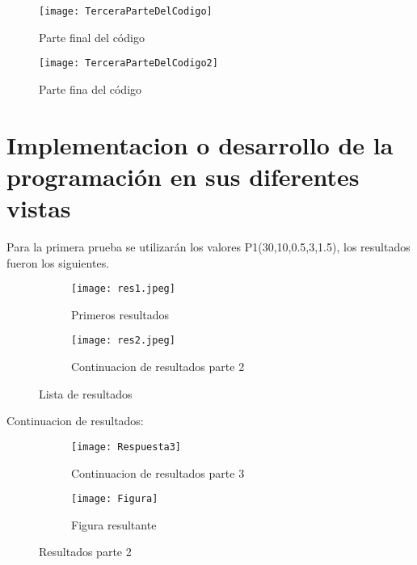 \documentclass{article}
\begin{document}
\begin{figure}[H] %
    \centering
    \texttt{[image: TerceraParteDelCodigo]} %
    \caption{Parte final del código}   
   \label{!}
\end{figure}
\begin{figure}[H] %
    \centering
    \texttt{[image: TerceraParteDelCodigo2]} %
    \caption{Parte fina del código}   
   \label{!}
\end{figure}


\clearpage
\section{Implementacion o desarrollo de la programación en sus diferentes vistas}
Para la primera prueba se utilizarán los valores P1(30,10,0.5,3,1.5), los resultados 
fueron los siguientes.

\begin{figure}[h]

\begin{subfigure}{0.5\textwidth}
\texttt{[image: res1.jpeg]} 
\caption{Primeros resultados}
\label{fig:subim1}
\end{subfigure}
\begin{subfigure}{0.5\textwidth}
\texttt{[image: res2.jpeg]}
\caption{Continuacion de resultados parte 2}
\label{fig:subim2}
\end{subfigure}

\caption{Lista de resultados}
\label{fig:image2}
\end{figure}

Continuacion de resultados:
\begin{figure}[H]

\begin{subfigure}{0.5\textwidth}
\texttt{[image: Respuesta3]} 
\caption{Continuacion de resultados parte 3}
\label{fig:subim1}
\end{subfigure}
\begin{subfigure}{0.5\textwidth}
\texttt{[image: Figura]}
\caption{Figura resultante }
\label{fig:subim2}
\end{subfigure}

\caption{Resultados parte 2}
\label{fig:image2}
\end{figure}
\end{document}

